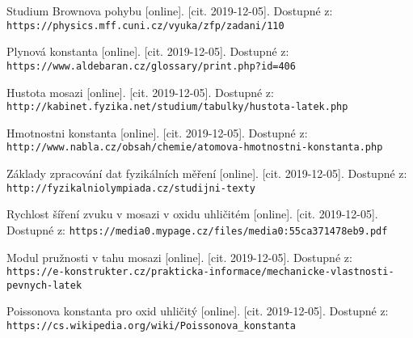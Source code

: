 \renewcommand\refname{Použitá literatura}
\begin{thebibliography}{}
Studium Brownova pohybu [online]. [cit. 2019-12-05]. Dostupné z: 
\\\texttt{https://physics.mff.cuni.cz/vyuka/zfp/zadani/110}


Plynová konstanta [online]. [cit. 2019-12-05]. Dostupné z:
\newline \texttt{https://www.aldebaran.cz/glossary/print.php?id=406}


Hustota mosazi [online]. [cit. 2019-12-05]. Dostupné z:
\newline \texttt{http://kabinet.fyzika.net/studium/tabulky/hustota-latek.php}


Hmotnostni konstanta [online]. [cit. 2019-12-05]. Dostupné z:
\newline \texttt{http://www.nabla.cz/obsah/chemie/atomova-hmotnostni-konstanta.php}


Základy zpracování dat fyzikálních měření [online]. [cit. 2019-12-05].
\newline Dostupné z:\\\texttt{http://fyzikalniolympiada.cz/studijni-texty}


Rychlost šíření zvuku v mosazi v oxidu uhličitém [online]. [cit. 2019-12-05]. Dostupné z:
\newline \texttt{https://media0.mypage.cz/files/media0:55ca371478eb9.pdf}


Modul pružnosti v tahu mosazi [online]. [cit. 2019-12-05]. Dostupné z:
\newline \texttt{https://e-konstrukter.cz/prakticka-informace/mechanicke-vlastnosti-pevnych-latek}


Poissonova konstanta pro oxid uhličitý  [online]. [cit. 2019-12-05]. Dostupné z:
\newline \texttt{https://cs.wikipedia.org/wiki/Poissonova\_konstanta}







\end{thebibliography}



